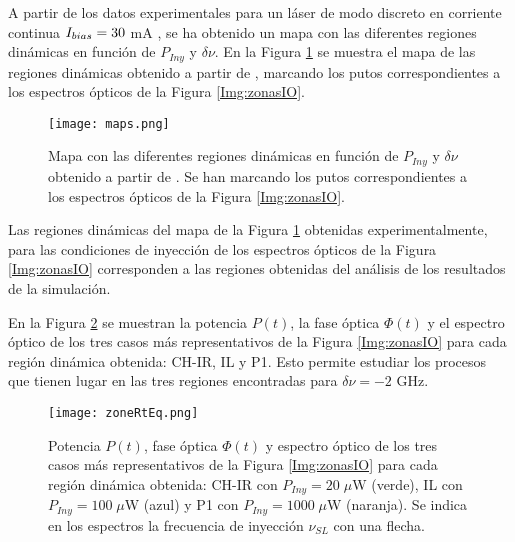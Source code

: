 		A partir de los datos experimentales para un láser de modo discreto en corriente continua $I_{bias} = 30$ mA \cite{Chaves19}, se ha obtenido un mapa con las diferentes regiones dinámicas en función de $P_{Iny}$ y $\delta\nu$. En la Figura \ref{fig:map} se muestra el mapa de las regiones dinámicas obtenido a partir de \cite{Chaves19}, marcando los putos correspondientes a los espectros ópticos de la Figura \ref{Img:zonasIO}.

			\begin{figure}[H]
				\centering
				\texttt{[image: maps.png]}
				\caption{\label{fig:map}Mapa con las diferentes regiones dinámicas en función de $P_{Iny}$ y $\delta\nu$ obtenido a partir de \cite{Chaves19}. Se han marcando los putos correspondientes a los espectros ópticos de la Figura \ref{Img:zonasIO}.}
			\end{figure}

		Las regiones dinámicas del mapa de la Figura \ref{fig:map} obtenidas experimentalmente, para las condiciones de inyección de los espectros ópticos de la Figura \ref{Img:zonasIO} corresponden a las regiones obtenidas del análisis de los resultados de la simulación.

		En la Figura \ref{fig:zoneRtEq} se muestran la potencia $P(t)$, la fase óptica $\Phi (t)$ y el espectro óptico de los tres casos más representativos de la Figura \ref{Img:zonasIO} para cada región dinámica obtenida: CH-IR, IL y P1. Esto permite estudiar los procesos que tienen lugar en las tres regiones encontradas para $\delta\nu = -2$ GHz. 

			\begin{figure}[H]
				\centering
				\texttt{[image: zoneRtEq.png]}
				\caption{\label{fig:zoneRtEq}Potencia $P(t)$, fase óptica $\Phi (t)$ y espectro óptico de los tres casos más representativos de la Figura \ref{Img:zonasIO} para cada región dinámica obtenida: CH-IR con $P_{Iny} = 20\;\mu$W (verde), IL con $P_{Iny} = 100\;\mu$W (azul) y P1 con $P_{Iny} = 1000\;\mu$W (naranja). Se indica en los espectros la frecuencia de inyección $\nu_{SL}$ con una flecha.}	
			\end{figure}

